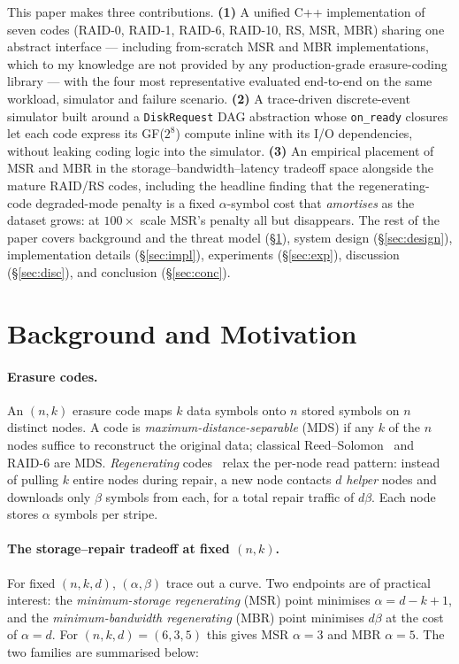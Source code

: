 \documentclass[letterpaper,twocolumn,10pt]{article}
\begin{document}
This paper makes three contributions. \textbf{(1)} A unified C++ implementation
of seven codes (RAID-0, RAID-1, RAID-6, RAID-10, RS, MSR, MBR) sharing one
abstract interface --- including from-scratch MSR and MBR implementations,
which to my knowledge are not provided by any production-grade erasure-coding
library --- with the four most representative evaluated end-to-end on the
same workload, simulator and failure scenario. \textbf{(2)} A trace-driven
discrete-event simulator built around a \texttt{DiskRequest} DAG
abstraction whose \texttt{on\_ready} closures let each code express its
GF($2^8$) compute inline with its I/O dependencies, without leaking coding
logic into the simulator. \textbf{(3)} An empirical placement of MSR and
MBR in the storage--bandwidth--latency tradeoff space alongside the mature
RAID/RS codes, including the headline finding that the regenerating-code
degraded-mode penalty is a fixed $\alpha$-symbol cost that \emph{amortises}
as the dataset grows: at $100\times$ scale MSR's penalty all but disappears. The rest of the paper
covers background and the threat model (\S\ref{sec:bg}), system design
(\S\ref{sec:design}), implementation details (\S\ref{sec:impl}),
experiments (\S\ref{sec:exp}), discussion (\S\ref{sec:disc}), and
conclusion (\S\ref{sec:conc}).

\section{Background and Motivation}
\label{sec:bg}

\paragraph{Erasure codes.}
An $(n,k)$ erasure code maps $k$ data symbols onto $n$ stored symbols on $n$
distinct nodes. A code is \emph{maximum-distance-separable} (MDS) if any $k$
of the $n$ nodes suffice to reconstruct the original data; classical
Reed--Solomon~\cite{reed60,plank97} and RAID-6 are MDS. \emph{Regenerating}
codes~\cite{dimakis10} relax the per-node read pattern: instead of pulling
$k$ entire nodes during repair, a new node contacts $d$ \emph{helper} nodes
and downloads only $\beta$ symbols from each, for a total repair traffic of
$d\beta$. Each node stores $\alpha$ symbols per stripe.

\paragraph{The storage--repair tradeoff at fixed $(n,k)$.}
For fixed $(n,k,d)$, $(\alpha,\beta)$ trace out a curve. Two endpoints are
of practical interest: the \emph{minimum-storage regenerating} (MSR) point
minimises $\alpha = d-k+1$, and the \emph{minimum-bandwidth regenerating}
(MBR) point minimises $d\beta$ at the cost of $\alpha = d$. For
$(n,k,d)=(6,3,5)$ this gives MSR $\alpha=3$ and MBR $\alpha=5$. The two
families are summarised below:
\end{document}
